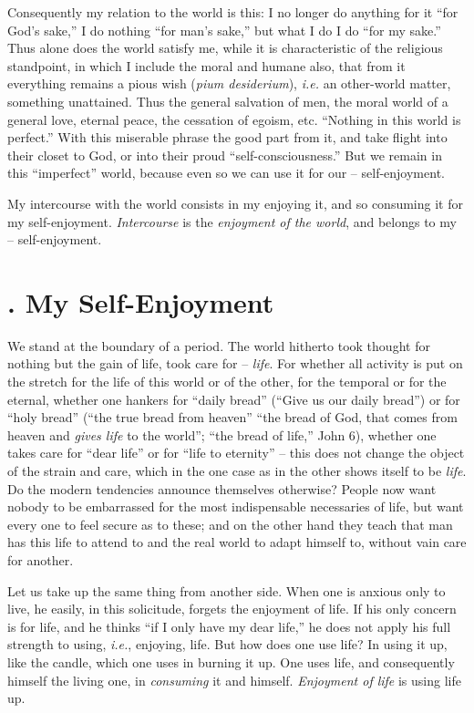 \documentclass[12pt,a4paper]{book}
\begin{document}
Consequently my relation to the world is this: I no longer do anything for it 
``for God's sake,'' I do nothing ``for man's sake,'' but what I do I do 
``for my sake.'' Thus alone does the world satisfy me, while it is 
characteristic of the religious standpoint, in which I include the moral and 
humane also, that from it everything remains a pious wish (\textit{pium 
desiderium}), \textit{i.e.} an other-world matter, something unattained. Thus 
the general salvation of men, the moral world of a general love, eternal 
peace, the cessation of egoism, etc. ``Nothing in this world is perfect.'' 
With this miserable phrase the good part from it, and take flight into their 
closet to God, or into their proud ``self-consciousness.'' But we remain in 
this ``imperfect'' world, because even so we can use it for our -- 
self-enjoyment.

My intercourse with the world consists in my enjoying it, and so consuming it 
for my self-enjoyment. \textit{Intercourse} is the \textit{enjoyment of the 
world}, and belongs to my -- self-enjoyment.

\section[3. My Self-Enjoyment]{. My Self-Enjoyment}

We stand at the boundary of a period. The world hitherto took thought for 
nothing but the gain of life, took care for -- \textit{life}. For whether all 
activity is put on the stretch for the life of this world or of the other, for 
the temporal or for the eternal, whether one hankers for ``daily bread'' 
(``Give us our daily bread'') or for ``holy bread'' (``the true bread 
from heaven'' ``the bread of God, that comes from heaven and \textit{gives 
life} to the world''; ``the bread of life,'' John 6), whether one takes 
care for ``dear life'' or for ``life to eternity'' -- this does not change 
the object of the strain and care, which in the one case as in the other shows 
itself to be \textit{life}. Do the modern tendencies announce themselves 
otherwise? People now want nobody to be embarrassed for the most indispensable 
necessaries of life, but want every one to feel secure as to these; and on the 
other hand they teach that man has this life to attend to and the real world 
to adapt himself to, without vain care for another.

Let us take up the same thing from another side. When one is anxious only to 
live, he easily, in this solicitude, forgets the enjoyment of life. If his 
only concern is for life, and he thinks ``if I only have my dear life,'' he 
does not apply his full strength to using, \textit{i.e.}, enjoying, life. But 
how does one use life? In using it up, like the candle, which one uses in 
burning it up. One uses life, and consequently himself the living one, in 
\textit{consuming} it and himself. \textit{Enjoyment of life} is using life 
up.
\end{document}
